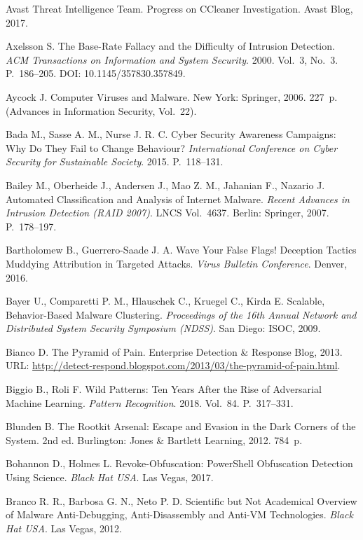  Avast Threat Intelligence Team. Progress on CCleaner Investigation. Avast Blog, 2017.

 Axelsson S. The Base-Rate Fallacy and the Difficulty of Intrusion Detection. \emph{ACM Transactions on Information and System Security}. 2000. Vol.~3, No.~3. P.~186--205. DOI: 10.1145/357830.357849.

 Aycock J. Computer Viruses and Malware. New York: Springer, 2006. 227~p. (Advances in Information Security, Vol.~22).

 Bada M., Sasse A. M., Nurse J. R. C. Cyber Security Awareness Campaigns: Why Do They Fail to Change Behaviour? \emph{International Conference on Cyber Security for Sustainable Society}. 2015. P.~118--131.

 Bailey M., Oberheide J., Andersen J., Mao Z. M., Jahanian F., Nazario J. Automated Classification and Analysis of Internet Malware. \emph{Recent Advances in Intrusion Detection (RAID 2007)}. LNCS Vol.~4637. Berlin: Springer, 2007. P.~178--197.

 Bartholomew B., Guerrero-Saade J. A. Wave Your False Flags! Deception Tactics Muddying Attribution in Targeted Attacks. \emph{Virus Bulletin Conference}. Denver, 2016.

 Bayer U., Comparetti P. M., Hlauschek C., Kruegel C., Kirda E. Scalable, Behavior-Based Malware Clustering. \emph{Proceedings of the 16th Annual Network and Distributed System Security Symposium (NDSS)}. San Diego: ISOC, 2009.

 Bianco D. The Pyramid of Pain. Enterprise Detection \& Response Blog, 2013. URL: \url{http://detect-respond.blogspot.com/2013/03/the-pyramid-of-pain.html}.

 Biggio B., Roli F. Wild Patterns: Ten Years After the Rise of Adversarial Machine Learning. \emph{Pattern Recognition}. 2018. Vol.~84. P.~317--331.

 Blunden B. The Rootkit Arsenal: Escape and Evasion in the Dark Corners of the System. 2nd ed. Burlington: Jones \& Bartlett Learning, 2012. 784~p.

 Bohannon D., Holmes L. Revoke-Obfuscation: PowerShell Obfuscation Detection Using Science. \emph{Black Hat USA}. Las Vegas, 2017.

 Branco R. R., Barbosa G. N., Neto P. D. Scientific but Not Academical Overview of Malware Anti-Debugging, Anti-Disassembly and Anti-VM Technologies. \emph{Black Hat USA}. Las Vegas, 2012.

